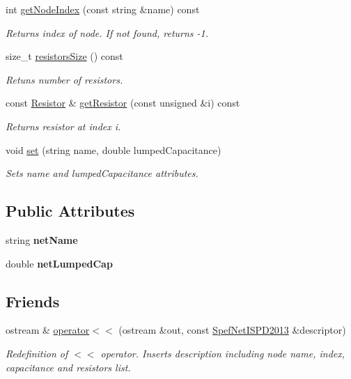\begin{DoxyCompactItemize}
int \hyperlink{classSpefNetISPD2013_aa5143da0b98e3fa1613562061238f4ee}{get\-Node\-Index} (const string \&name) const 
\begin{DoxyCompactList}\small\item\em Returns index of node. If not found, returns -\/1. \end{DoxyCompactList}\item 
size\-\_\-t \hyperlink{classSpefNetISPD2013_a1a15314aec6fae289f90b9e7de201fe8}{resistors\-Size} () const 
\begin{DoxyCompactList}\small\item\em Retuns number of resistors. \end{DoxyCompactList}\item 
const \hyperlink{structSpefNetISPD2013_1_1Resistor}{Resistor} \& \hyperlink{classSpefNetISPD2013_a1baa70cdf4b2c65a7e695849c2ad2525}{get\-Resistor} (const unsigned \&i) const 
\begin{DoxyCompactList}\small\item\em Returns resistor at index i. \end{DoxyCompactList}\item 
void \hyperlink{classSpefNetISPD2013_a3a0ed208b150100bda0544112fb1c0ba}{set} (string name, double lumped\-Capacitance)
\begin{DoxyCompactList}\small\item\em Sets name and lumped\-Capacitance attributes. \end{DoxyCompactList}\end{DoxyCompactItemize}
\subsection*{Public Attributes}
\begin{DoxyCompactItemize}
\item 
\hypertarget{classSpefNetISPD2013_a1aa3f32d0cac9a7b1800ab67903361fa}{string {\bfseries net\-Name}}\label{classSpefNetISPD2013_a1aa3f32d0cac9a7b1800ab67903361fa}

\item 
\hypertarget{classSpefNetISPD2013_af088c8d7cbca748a4a56ab796ccb2fd5}{double {\bfseries net\-Lumped\-Cap}}\label{classSpefNetISPD2013_af088c8d7cbca748a4a56ab796ccb2fd5}

\end{DoxyCompactItemize}
\subsection*{Friends}
\begin{DoxyCompactItemize}
\item 
ostream \& \hyperlink{classSpefNetISPD2013_a6a52417a5250abf94d511910add3415e}{operator$<$$<$} (ostream \&out, const \hyperlink{classSpefNetISPD2013}{Spef\-Net\-I\-S\-P\-D2013} \&descriptor)
\begin{DoxyCompactList}\small\item\em Redefinition of $<$$<$ operator. Inserts description including node name, index, capacitance and resistors list. \end{DoxyCompactList}\end{DoxyCompactItemize}


